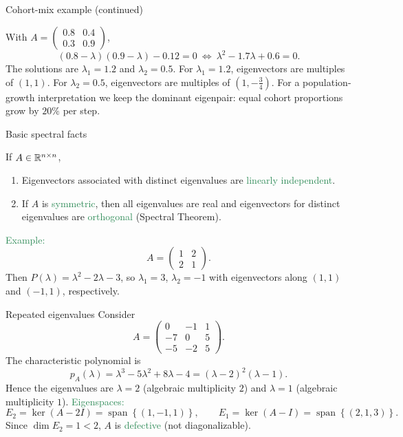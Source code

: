 \documentclass[11pt,aspectratio=169]{beamer}
\begin{document}
\begin{frame}{Cohort-mix example (continued)}
 
With
\(
A=\begin{pmatrix}0.8&0.4\\ 0.3&0.9\end{pmatrix}
\),
\[
(0.8-\lambda)(0.9-\lambda)-0.12=0
\ \Longleftrightarrow\
\lambda^2-1.7\lambda+0.6=0.
\]
The solutions are $\lambda_1=1.2$ and $\lambda_2=0.5$.
\vskip 4pt
For $\lambda_1=1.2$, eigenvectors are multiples of $(1,1)$. For $\lambda_2=0.5$, eigenvectors are multiples of $(1,-\tfrac{3}{4})$.
\vskip 4pt
{\tiny For a population-growth interpretation we keep the dominant eigenpair: equal cohort proportions grow by $20\%$ per step.}
 
\end{frame}

\begin{frame}{Basic spectral facts}
\begin{block}{}
If $A\in\mathbb R^{n\times n}$,
\begin{enumerate}
\item Eigenvectors associated with distinct eigenvalues are \textcolor{SeaGreen}{linearly independent}.

\item If $A$ is \textcolor{SeaGreen}{symmetric}, then all eigenvalues are real and eigenvectors for distinct eigenvalues are \textcolor{SeaGreen}{orthogonal} (Spectral Theorem).
\end{enumerate}
\end{block}

\bigskip
\textcolor{SeaGreen}{Example:}
\[
A=\begin{pmatrix}1&2\\ 2&1\end{pmatrix}.
\]
Then $P(\lambda)=\lambda^2-2\lambda-3$, so $\lambda_1=3$, $\lambda_2=-1$ with eigenvectors along $(1,1)$ and $(-1,1)$, respectively.

\end{frame}



\begin{frame}{Repeated eigenvalues}
Consider
\[
A=\begin{pmatrix}
0&-1&1\\
-7&0&5\\
-5&-2&5
\end{pmatrix}.
\]
The characteristic polynomial is
\[
p_A(\lambda)=\lambda^3-5\lambda^2+8\lambda-4=(\lambda-2)^2(\lambda-1).
\]
Hence the eigenvalues are $\lambda=2$ (algebraic multiplicity $2$) and $\lambda=1$ (algebraic multiplicity $1$).
\vskip6pt
\textcolor{SeaGreen}{Eigenspaces:}
\[
E_{2}=\ker(A-2I)=\operatorname{span}\!\left\{(1,-1,1)\right\}, 
\qquad
E_{1}=\ker(A-I)=\operatorname{span}\!\left\{(2,1,3)\right\}.
\]
Since $\dim E_{2}=1<2$, $A$ is \textcolor{SeaGreen}{defective} (not diagonalizable). 
\end{frame}
\end{document}
